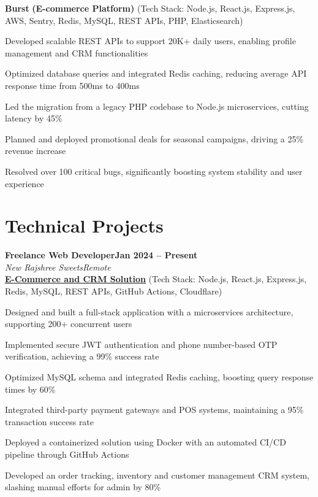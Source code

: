 \documentclass[letterpaper, 10pt]{article}
\newcommand{\heading}[2]{ \hspace{6pt}#1\hfill#2\\[0.8pt] }
\newcommand{\headingBf}[2]{ \heading{\textbf{#1}}{\textbf{#2}} }
\newcommand{\headingIt}[2]{ \heading{\textit{#1}}{\textit{#2}} }
\newenvironment{resume_list}{
\vspace{-5pt}
\begin{itemize}[itemsep=-3pt, parsep=0.2pt, leftmargin=20pt] }{ \end{itemize}
\vspace{-4pt}
}
\begin{document}
	\vspace{2pt}

	\hspace{10pt}\textbf{Burst} \textbf{(E-commerce Platform)} \small{(Tech Stack: Node.js, React.js, Express.js, AWS, Sentry, Redis, MySQL, REST APIs, PHP, Elasticsearch)}
	\vspace{1pt}
	\begin{resume_list}
		\item Developed scalable REST APIs to support 20K+ daily users, enabling profile
		management and CRM functionalities \item Optimized database queries and integrated
		Redis caching, reducing average API response time from 500ms to 400ms \item
		Led the migration from a legacy PHP codebase to Node.js microservices, cutting
		latency by 45\% \item Planned and deployed promotional deals for seasonal
		campaigns, driving a 25\% revenue increase \item Resolved over 100 critical
		bugs, significantly boosting system stability and user experience
	\end{resume_list}

	\section{Technical Projects}
	\headingBf{Freelance Web Developer}{Jan 2024 -- Present}
	\vspace{1pt}
	\headingIt{New Rajshree Sweets}{Remote}
	\vspace{2pt}
	\hspace{10pt}\textbf{\href{https://newrajshreesweets.com}{\underline{E-Commerce and CRM Solution}}}
	\small{(Tech Stack: Node.js, React.js, Express.js, Redis, MySQL, REST APIs, GitHub Actions, Cloudflare)}
	\vspace{1pt}
	\begin{resume_list}
		\item Designed and built a full-stack application with a microservices architecture,
		supporting 200+ concurrent users \item Implemented secure JWT authentication
		and phone number-based OTP verification, achieving a 99\% success rate \item
		Optimized MySQL schema and integrated Redis caching, boosting query response
		times by 60\% \item Integrated third-party payment gateways and POS systems,
		maintaining a 95\% transaction success rate \item Deployed a containerized solution
		using Docker with an automated CI/CD pipeline through GitHub Actions \item Developed
		an order tracking, inventory and customer management CRM system, slashing manual
		efforts for admin by 80\%
	\end{resume_list}
\end{document}
